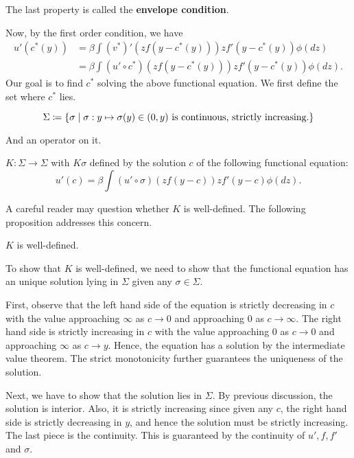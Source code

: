 \documentclass[12pt]{article}
\begin{document}
\begin{remark}
    The last property is called the \textbf{envelope condition}.
\end{remark}

Now, by the first order condition, we have 
\begin{equation}
    \begin{split}
        u'(c^*(y)) &= \beta\int (v^*)'(zf(y-c^*(y)))zf'(y-c^*(y))\phi(dz)\\
        &= \beta\int (u'\circ c^*)(zf(y-c^*(y)))zf'(y-c^*(y))\phi(dz).
    \end{split}
\end{equation}
Our goal is to find $c^*$ solving the above functional 
equation. We first define the set where $c^*$ lies. 
\begin{definition}
    \begin{equation}
        \Sigma \coloneqq \left\{ \sigma \;\middle\vert\; \sigma:y\mapsto \sigma(y)\in(0,y)
        \text{ is continuous, strictly increasing.} \right\}
    \end{equation}
\end{definition}
And an operator on it.
\begin{definition}
    $K: \Sigma \to \Sigma$ with $K\sigma$ defined by the solution $c$ of 
    the following functional equation:
    \begin{equation}
        u'(c) = \beta\int (u'\circ \sigma)(zf(y-c))zf'(y-c)\phi(dz).
    \end{equation}
\end{definition}

A careful reader may question whether $K$ is 
well-defined. The following proposition addresses 
this concern.
\begin{proposition}
    $K$ is well-defined.
\end{proposition}
\begin{pf}
    To show that $K$ is well-defined, we need to show that 
    the functional equation has an unique solution lying in 
    $\Sigma$ given any $\sigma\in\Sigma$. 

    First, observe that the left hand side of the equation 
    is strictly decreasing in $c$ with the value approaching 
    $\infty$ as $c\to 0$ and approaching $0$ as $c\to \infty$. 
    The right hand side is strictly increasing in $c$ with the 
    value approaching $0$ as $c\to 0$ and approaching $\infty$ 
    as $c\to y$. Hence, the equation has a solution by the 
    intermediate value theorem. The strict monotonicity further 
    guarantees the uniqueness of the solution.

    Next, we have to show that the solution lies in $\Sigma$. 
    By previous discussion, the solution is interior. Also, 
    it is strictly increasing since given any $c$, the right 
    hand side is strictly decreasing in $y$, and hence the 
    solution must be strictly increasing. The last piece is 
    the continuity. This is guaranteed by the continuity of 
    $u', f, f'$ and $\sigma$.
\end{pf}
\end{document}
